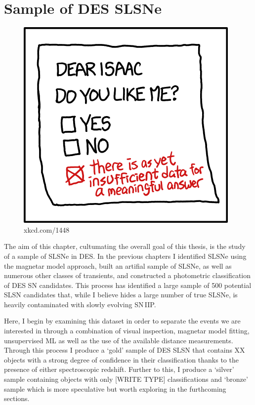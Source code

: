 \chapter{Sample of DES SLSNe}
\label{Chapter6}

\begin{figure}[H]
  \centering
  \includegraphics{Figures/xkcd/chapter6.png}
  \caption*{xkcd.com/1448}
\end{figure}

The aim of this chapter, cultumating the overall goal of this thesis, is the study of a sample of SLSNe in DES. In the previous chapters I identified SLSNe using the magnetar model approach, built an artifial sample of SLSNe, as well as numerous other classes of transients, and constructed a photometric classification of DES SN candidates. This process has identified a large sample of 500 potential SLSN candidates that, while I believe hides a large number of true SLSNe, is heavily contaminated with slowly evolving SN\,IIP.

Here, I begin by examining this dataset in order to separate the events we are interested in through a combination of visual inspection, magnetar model fitting, unsupervised ML as well as the use of the available distance measurements. Through this process I produce a `gold' sample of DES SLSN that contains XX objects with a strong degree of confidence in their classification thanks to the presence of either spectroscopic redshift. Further to this, I produce a `silver' sample containing objects with only [WRITE TYPE] classifications and `bronze' sample which is more speculative but worth exploring in the furthcoming sections.

